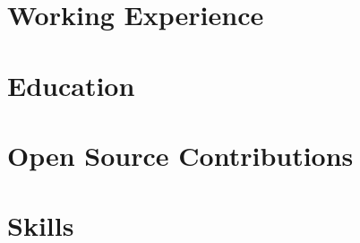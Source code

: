 \documentclass[letter,10pt]{article}
\begin{document}


\section{Working Experience}



\section{Education}



\section{Open Source Contributions}


\section{Skills}

\end{document}

